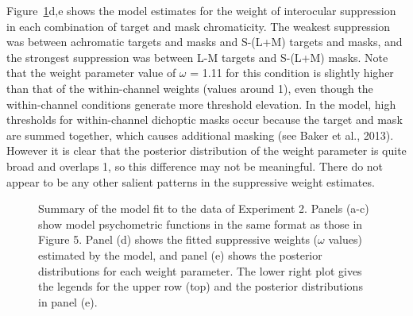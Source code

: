 \documentclass[
  letterpaper,
  DIV=11,
  numbers=noendperiod]{scrartcl}
\begin{document}
Figure~\ref{fig-MCSmodel}d,e shows the model estimates for the weight of
interocular suppression in each combination of target and mask
chromaticity. The weakest suppression was between achromatic targets and
masks and S-(L+M) targets and masks, and the strongest suppression was
between L-M targets and S-(L+M) masks. Note that the weight parameter
value of \(\omega\) = 1.11 for this condition is slightly higher than
that of the within-channel weights (values around 1), even though the
within-channel conditions generate more threshold elevation. In the
model, high thresholds for within-channel dichoptic masks occur because
the target and mask are summed together, which causes additional masking
(see Baker et al., 2013). However it is clear that the posterior
distribution of the weight parameter is quite broad and overlaps 1, so
this difference may not be meaningful. There do not appear to be any
other salient patterns in the suppressive weight estimates.

\begin{figure}


\caption{\label{fig-MCSmodel}Summary of the model fit to the data of
Experiment 2. Panels (a-c) show model psychometric functions in the same
format as those in Figure 5. Panel (d) shows the fitted suppressive
weights (\(\omega\) values) estimated by the model, and panel (e) shows
the posterior distributions for each weight parameter. The lower right
plot gives the legends for the upper row (top) and the posterior
distributions in panel (e).}

\end{figure}%
\end{document}
